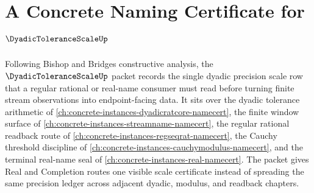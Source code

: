 \chapter{A Concrete Naming Certificate for $\DyadicToleranceScaleUp$}
\label{ch:concrete-instances-dyadic-tolerance-scale-namecert}

Following Bishop and Bridges constructive analysis, the $\DyadicToleranceScaleUp$ packet records the single dyadic precision scale row that a regular rational or real-name consumer must read before turning finite stream observations into endpoint-facing data. It sits over the dyadic tolerance arithmetic of \autoref{ch:concrete-instances-dyadicratcore-namecert}, the finite window surface of \autoref{ch:concrete-instances-streamname-namecert}, the regular rational readback route of \autoref{ch:concrete-instances-regseqrat-namecert}, the Cauchy threshold discipline of \autoref{ch:concrete-instances-cauchymodulus-namecert}, and the terminal real-name seal of \autoref{ch:concrete-instances-real-namecert}. The packet gives Real and Completion routes one visible scale certificate instead of spreading the same precision ledger across adjacent dyadic, modulus, and readback chapters.

